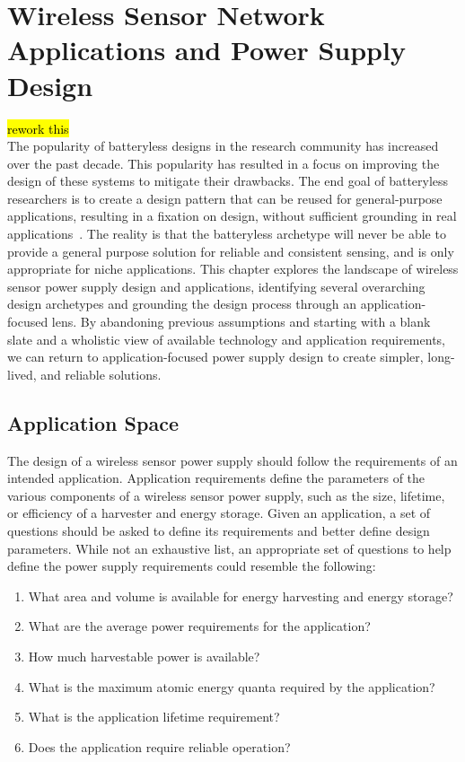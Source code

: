 \chapter{Wireless Sensor Network Applications and Power Supply Design}

\hl{rework this}\\
The popularity of batteryless designs in the research community has increased over the past decade. This popularity has resulted in a focus on improving the design of these systems to mitigate their drawbacks. 
The end goal of batteryless researchers is to create a design pattern that can be reused for general-purpose applications, resulting in a fixation on design, without sufficient grounding in real applications~\cite{hester2017future}. The reality is that the batteryless archetype will never be able to provide a general purpose solution for reliable and consistent sensing, and is only appropriate for niche applications.
This chapter explores the landscape of wireless sensor power supply design and applications,
identifying several overarching design archetypes and
grounding the design process through an application-focused lens.
By abandoning previous assumptions 
and starting with a blank slate and a wholistic view of available technology and application requirements, we can return to application-focused power supply design to create simpler, long-lived, and reliable solutions.

\section{Application Space}

The design of a wireless sensor power supply should follow the requirements of an intended application.
Application requirements define the parameters of the various components of a wireless sensor power supply, such as the size, lifetime, or efficiency of a harvester and energy storage.
Given an application, a set of questions should be asked to define its requirements and better define design parameters.
While not an exhaustive list, an appropriate set of questions to help define the power supply requirements could resemble the following:

\begin{enumerate}
    \item What area and volume is available for energy harvesting and energy storage?
    \item What are the average power requirements for the application?
    \item How much harvestable power is available?
    \item What is the maximum atomic energy quanta required by the application?
    \item What is the application lifetime requirement?
    \item Does the application require reliable operation?
\end{enumerate}

